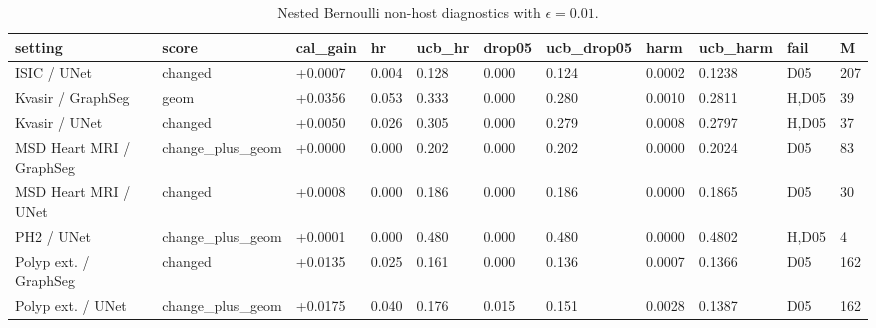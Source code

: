 \begin{table}[t]
\centering
\small
\caption{Nested Bernoulli non-host diagnostics with $\epsilon=0.01$.}
\label{tab:tail_risk_nested_eps001_bernoulli_nonhost_diag}
\begin{tabular}{lllllllllll}
\toprule
setting & score & cal\_gain & hr & ucb\_hr & drop05 & ucb\_drop05 & harm & ucb\_harm & fail & M \\
\midrule
ISIC / UNet & changed & +0.0007 & 0.004 & 0.128 & 0.000 & 0.124 & 0.0002 & 0.1238 & D05 & 207 \\
Kvasir / GraphSeg & geom & +0.0356 & 0.053 & 0.333 & 0.000 & 0.280 & 0.0010 & 0.2811 & H,D05 & 39 \\
Kvasir / UNet & changed & +0.0050 & 0.026 & 0.305 & 0.000 & 0.279 & 0.0008 & 0.2797 & H,D05 & 37 \\
MSD Heart MRI / GraphSeg & change\_plus\_geom & +0.0000 & 0.000 & 0.202 & 0.000 & 0.202 & 0.0000 & 0.2024 & D05 & 83 \\
MSD Heart MRI / UNet & changed & +0.0008 & 0.000 & 0.186 & 0.000 & 0.186 & 0.0000 & 0.1865 & D05 & 30 \\
PH2 / UNet & change\_plus\_geom & +0.0001 & 0.000 & 0.480 & 0.000 & 0.480 & 0.0000 & 0.4802 & H,D05 & 4 \\
Polyp ext. / GraphSeg & changed & +0.0135 & 0.025 & 0.161 & 0.000 & 0.136 & 0.0007 & 0.1366 & D05 & 162 \\
Polyp ext. / UNet & change\_plus\_geom & +0.0175 & 0.040 & 0.176 & 0.015 & 0.151 & 0.0028 & 0.1387 & D05 & 162 \\
\bottomrule
\end{tabular}
\end{table}
